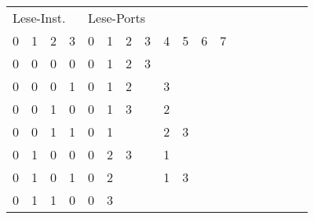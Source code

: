 \begin{table}[htbp]
\begin{minipage}{.4\textwidth}
		\begin{tabular}{cccccccccccccccccc}
			\multicolumn{4}{l}{Lese-Inst.}                 & \multicolumn{8}{|l}{Lese-Ports}                                                               \\ 
			\multicolumn{1}{c}{0} & \multicolumn{1}{c}{1} & \multicolumn{1}{c}{2} & \multicolumn{1}{c}{3} & \multicolumn{1}{|c}{0} & \multicolumn{1}{c}{1} & \multicolumn{1}{c}{2}& \multicolumn{1}{c}{3} &
			\multicolumn{1}{c}{4} & \multicolumn{1}{c}{5} & \multicolumn{1}{c}{6}& \multicolumn{1}{c}{7} \\
			\hline
			\multicolumn{1}{c}{0} & \multicolumn{1}{c}{0} & \multicolumn{1}{c}{0} & \multicolumn{1}{c}{0} & \multicolumn{1}{|c}{0} & \multicolumn{1}{c}{1} & \multicolumn{1}{c}{2}& \multicolumn{1}{c}{3} &
			\multicolumn{1}{c}{} & \multicolumn{1}{c}{} & \multicolumn{1}{c}{}& \multicolumn{1}{c}{} \\
			\multicolumn{1}{c}{0} & \multicolumn{1}{c}{0} & \multicolumn{1}{c}{0} & \multicolumn{1}{c}{1} & \multicolumn{1}{|c}{0} & \multicolumn{1}{c}{1} & \multicolumn{1}{c}{2}& \multicolumn{1}{c}{} &
			\multicolumn{1}{c}{3} & \multicolumn{1}{c}{} & \multicolumn{1}{c}{}& \multicolumn{1}{c}{} \\
			\multicolumn{1}{c}{0} & \multicolumn{1}{c}{0} & \multicolumn{1}{c}{1} & \multicolumn{1}{c}{0} & \multicolumn{1}{|c}{0} & \multicolumn{1}{c}{1} & \multicolumn{1}{c}{3}& \multicolumn{1}{c}{} &
			\multicolumn{1}{c}{2} & \multicolumn{1}{c}{} & \multicolumn{1}{c}{}& \multicolumn{1}{c}{} \\
			\multicolumn{1}{c}{0} & \multicolumn{1}{c}{0} & \multicolumn{1}{c}{1} & \multicolumn{1}{c}{1} & \multicolumn{1}{|c}{0} & \multicolumn{1}{c}{1} & \multicolumn{1}{c}{}& \multicolumn{1}{c}{} &
			\multicolumn{1}{c}{2} & \multicolumn{1}{c}{3} & \multicolumn{1}{c}{}& \multicolumn{1}{c}{} \\
			\multicolumn{1}{c}{0} & \multicolumn{1}{c}{1} & \multicolumn{1}{c}{0} & \multicolumn{1}{c}{0} & \multicolumn{1}{|c}{0} & \multicolumn{1}{c}{2} & \multicolumn{1}{c}{3}& \multicolumn{1}{c}{} &
			\multicolumn{1}{c}{1} & \multicolumn{1}{c}{} & \multicolumn{1}{c}{}& \multicolumn{1}{c}{} \\
			\multicolumn{1}{c}{0} & \multicolumn{1}{c}{1} & \multicolumn{1}{c}{0} & \multicolumn{1}{c}{1} & \multicolumn{1}{|c}{0} & \multicolumn{1}{c}{2} & \multicolumn{1}{c}{}& \multicolumn{1}{c}{} &
			\multicolumn{1}{c}{1} & \multicolumn{1}{c}{3} & \multicolumn{1}{c}{}& \multicolumn{1}{c}{} \\
			\multicolumn{1}{c}{0} & \multicolumn{1}{c}{1} & \multicolumn{1}{c}{1} & \multicolumn{1}{c}{0} & \multicolumn{1}{|c}{0} & \multicolumn{1}{c}{3} & \multicolumn{1}{c}{}& \multicolumn{1}{c}{} &

\end{tabular}
\end{minipage}
\end{table}
